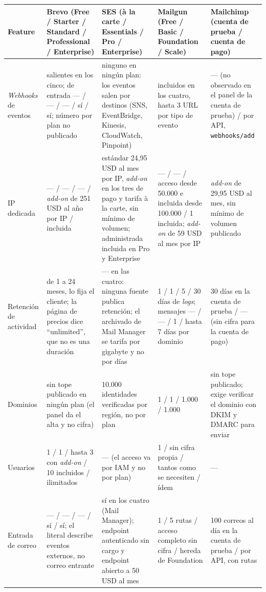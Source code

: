 \begin{table}[H]
\centering
\scriptsize
\setlength{\tabcolsep}{3pt}
\begin{tabular}{|p{2cm}|p{3cm}|p{3cm}|p{3cm}|p{3.1cm}|}
\hline
\textbf{Feature} & \textbf{Brevo} (Free / Starter / Standard / Professional / Enterprise) & \textbf{SES} (à la carte / Essentials / Pro / Enterprise) & \textbf{Mailgun} (Free / Basic / Foundation / Scale) & \textbf{Mailchimp} (cuenta de prueba / cuenta de pago) \\
\hline
\textit{Webhooks} de eventos & salientes en los cinco; de entrada --- / --- / --- / sí / sí; número por plan no publicado & ninguno en ningún plan: los eventos salen por destinos (SNS, EventBridge, Kinesis, CloudWatch, Pinpoint) & incluidos en los cuatro, hasta 3 URL por tipo de evento & --- (no observado en el panel de la cuenta de prueba) / por API, \texttt{webhooks/add} \\
\hline
IP dedicada & --- / --- / --- / \textit{add-on} de 251 USD al año por IP / incluida & estándar 24,95 USD al mes por IP, \textit{add-on} en los tres de pago y tarifa à la carte, sin mínimo de volumen; administrada incluida en Pro y Enterprise & --- / --- / acceso desde 50.000 e incluida desde 100.000 / 1 incluida; \textit{add-on} de 59 USD al mes por IP & \textit{add-on} de 29,95 USD al mes, sin mínimo de volumen publicado \\
\hline
Retención de actividad & de 1 a 24 meses, lo fija el cliente; la página de precios dice ``unlimited'', que no es una duración & --- en las cuatro: ninguna fuente publica retención; el archivado de Mail Manager se tarifa por gigabyte y no por días & 1 / 1 / 5 / 30 días de \textit{logs}; mensajes --- / --- / 1 / hasta 7 días por dominio & 30 días en la cuenta de prueba / --- (sin cifra para la cuenta de pago) \\
\hline
Dominios & sin tope publicado en ningún plan (el panel da el alta y no cifra) & 10.000 identidades verificadas por región, no por plan & 1 / 1 / 1.000 / 1.000 & sin tope publicado; exige verificar el dominio con DKIM y DMARC para enviar \\
\hline
Usuarios & 1 / 1 / hasta 3 con \textit{add-on} / 10 incluidos / ilimitados & --- (el acceso va por IAM y no por plan) & 1 / sin cifra propia / tantos como se necesiten / ídem & --- \\
\hline
Entrada de correo & --- / --- / --- / sí / sí; el literal describe eventos externos, no correo entrante & sí en los cuatro (Mail Manager); endpoint autenticado sin cargo y endpoint abierto a 50 USD al mes & 1 / 5 rutas / acceso completo sin cifra / hereda de Foundation & 100 correos al día en la cuenta de prueba / por API, con rutas \\

\end{tabular}
\end{table}
